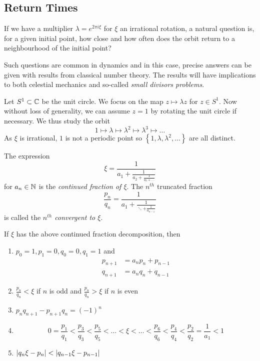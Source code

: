 \documentclass[../main.tex]{subfiles}
\begin{document}
\subsection{Return Times}
If we have a multiplier $\lambda = e^{2\pi i \xi}$ for $\xi$ an irrational rotation, a natural question is, for a given initial point, how close and how often does the orbit return to a neighbourhood of the initial point?

Such questions are common in dynamics and in this case, precise answers can be given with results from classical number theory. The results will have implications to both celestial mechanics and so-called \textit{small divisors problems}.

Let $S^1 \subset \mathbb{C}$ be the unit circle. We focus on the map $z \mapsto \lambda z$ for $z \in S^1$. Now without loss of generality, we can assume $z = 1$ by rotating the unit circle if necessary. We thus study the orbit
\[
1 \longmapsto \lambda \longmapsto \lambda^2 \longmapsto \lambda^3 \longmapsto \dots
\]
As $\xi$ is irrational, $1$ is not a periodic point so $\left\{1, \lambda, \lambda^2, \dots \right\}$ are all distinct.

\begin{dfn}
The expression
\[
\xi = \frac{1}{a_1 + \frac{1}{a_2 + \frac{1}{a_3 + \dots}}}
\]
for $a_n \in \mathbb{N}$ is the \textit{continued fraction of $\xi$}. The $n^{th}$ truncated fraction
\[
\frac{p_{n}}{q_{n}} = \frac{1}{a_1 + \frac{1}{\ddots + \frac{1}{a_{n-1}}}}
\]
is called the \textit{$n^{th}$ convergent to $\xi$}.
\end{dfn}

\begin{lem}
If $\xi$ has the above continued fraction decomposition, then
\begin{enumerate}
    \item $p_{0} = 1, p_{1} = 0, q_{0} = 0, q_{1} = 1$ and
    \begin{align*}
        p_{n+1} &= a_{n}p_{n} + p_{n-1}\\
        q_{n+1} &= a_{n}q_{n} + q_{n-1}
    \end{align*}
    \item $\frac{p_{n}}{q_{n}} < \xi$ if $n$ is odd and $\frac{p_{n}}{q_{n}} > \xi$ if $n$ is even
    \item $p_{n}q_{n+1} - p_{n+1}q_{n} = (-1)^{n}$
    \item 
    \[
    0 = \frac{p_1}{q_1} < \frac{p_3}{q_3} < \frac{p_5}{q_5} < \dots < \xi < \dots < \frac{p_6}{q_6} < \frac{p_4}{q_4} < \frac{p_2}{q_2} = \frac{1}{a_1} < 1
    \]
    \item $\left|q_{n}\xi - p_{n}\right| < \left|q_{n-1}\xi - p_{n-1}\right|$
\end{enumerate}
\end{lem}
\end{document}
